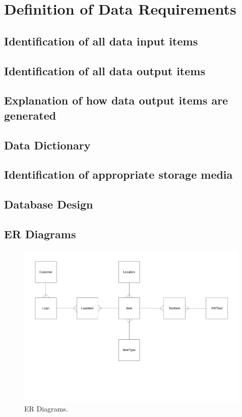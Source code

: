 \section{Definition of Data Requirements}

\subsection{Identification of all data input items}

\subsection{Identification of all data output items}

\subsection{Explanation of how data output items are generated}

\subsection{Data Dictionary}

\subsection{Identification of appropriate storage media}


\newpage

\begin{landscape}

\section{Database Design}

\subsection{ER Diagrams}

\begin{figure}[H]
    \centerline{\includegraphics[width=550px]{./Design/ER_Diagrams/ER_Diagram.pdf}}
    \caption{ER Diagrams.} \label{fig:ER Diagrams}
\end{figure}

\end{landscape}

